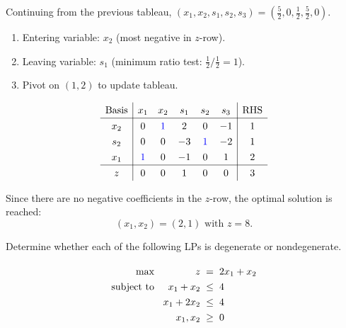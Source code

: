 \documentclass[a4paper, 10pt]{article}
\begin{document}
\begin{solution}
Continuing from the previous tableau, \( (x_1, x_2, s_1, s_2, s_3) = (\frac{5}{2}, 0, \frac{1}{2}, \frac{5}{2}, 0) \).
\begin{enumerate}
    \item Entering variable: \( x_2 \) (most negative in \( z \)-row).
    \item Leaving variable: \( s_1 \) (minimum ratio test: \( \frac{1}{2} / \frac{1}{2} = 1 \)).
    \item Pivot on \( (1,2) \) to update tableau.
\end{enumerate}
\[
\renewcommand{\arraystretch}{1.3}
\begin{array}{c|ccccc|c}
    \text{Basis} & x_1 & x_2 & s_1 & s_2 & s_3 & \text{RHS} \\
    \hline
    x_2 & 0 & \textcolor[HTML]{0000FF}{1} & 2 & 0 & -1 & 1 \\
    s_2 & 0 & 0 & -3 & \textcolor[HTML]{0000FF}{1} & -2 & 1 \\
    x_1 & \textcolor[HTML]{0000FF}{1} & 0 & -1 & 0 & 1 & 2 \\
    \hline
    z & 0 & 0 & 1 & 0 & 0 & 3 \\
\end{array}
\]

Since there are no negative coefficients in the \( z \)-row, the optimal solution is reached:
\[ \boxed{(x_1, x_2) = (2, 1) \text{ with }z = 8}. \]
\end{solution}


\begin{problem}
Determine whether each of the following LPs is degenerate or nondegenerate.
\end{problem}

\begin{subproblems_alpha}
    \item
    \[
    \begin{array}{@{\hspace{2mm}} r @{\hspace{2mm}} r @{\hspace{2mm}} c @{\hspace{2mm}} l}
        \text{max } & z & = & 2x_1 + x_2 \\
        \text{subject to } & x_1 + x_2 & \leq & 4 \\
        & x_1 + 2x_2 & \leq & 4 \\
        & x_1, x_2 & \geq & 0
    \end{array}
    \]
\end{subproblems_alpha}
\end{document}
